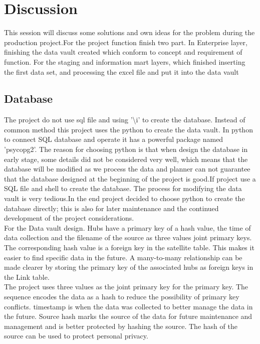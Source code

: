 \documentclass[conference]{IEEEtran}
\begin{document}
\section{Discussion}
This session will discuss some solutions and own ideas for the problem during the production project.For the project function finish two part.
In Enterprise layer, finishing the data vault created which conform to concept and requirement of function. For the staging and information mart layers, which finished inserting the first data set, and processing the excel file and put it into the data vault\\
\subsection{Database}\label{AA}
The project do not use sql file and using '\textbackslash i' to create the database. Instead of common method this project uses the python to create the data vault. In python to connect SQL database and operate it has a powerful package named 'psycopg2'. The reason for choosing python is that when design the database in early stage, some details did not be considered very well, which means that the database will be modified as we process the data and planner can not guarantee that the database designed at the beginning of the project is good.If project use a SQL file and shell to create the database. The process for modifying the data vault is very tedious.In the end project decided to choose python to create the database directly; this is also for later maintenance and the continued development of the project considerations.
\\
For the Data vault design. Hubs have a primary key of a hash value, the time of data collection and the filename of the source as three values joint primary keys. The corresponding hash value is a foreign key in the satellite table. This makes it easier to find specific data in the future. A many-to-many relationship can be made clearer by storing the primary key of the associated hubs as foreign keys in the Link table.\\

\hspace*{0.2cm} The project uses three values as the joint primary key for the primary key. The sequence encodes the data as a hash to reduce the possibility of primary key conflicts. timestamp is when the data was collected to better manage the data in the future. Source hash marks the source of the data for future maintenance and management and is better protected by hashing the source. The hash of the source can be used to protect personal privacy.
\end{document}

